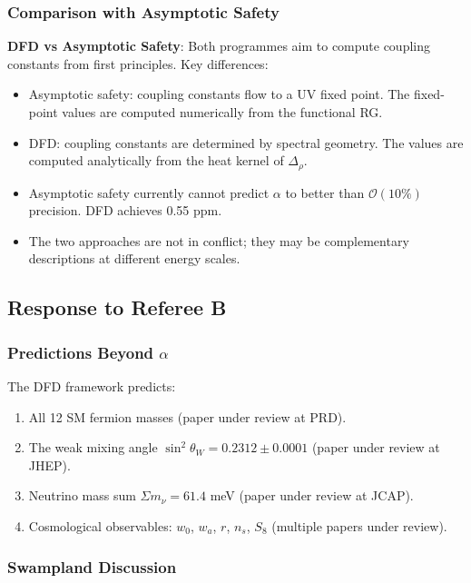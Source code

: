 \documentclass[11pt,a4paper]{article}
\begin{document}
\subsubsection{Comparison with Asymptotic Safety}

\begin{tcolorbox}[colback=blue!5!white, colframe=dfdblue]
\textbf{DFD vs Asymptotic Safety}: Both programmes aim to compute coupling constants from first principles. Key differences:
\begin{itemize}[nosep]
\item Asymptotic safety: coupling constants flow to a UV fixed point. The fixed-point values are computed numerically from the functional RG.
\item DFD: coupling constants are determined by spectral geometry. The values are computed analytically from the heat kernel of $\Delta_\rho$.
\item Asymptotic safety currently cannot predict $\alpha$ to better than $\mathcal{O}(10\%)$ precision. DFD achieves 0.55 ppm.
\item The two approaches are not in conflict; they may be complementary descriptions at different energy scales.
\end{itemize}
\end{tcolorbox}

\subsection{Response to Referee B}

\subsubsection{Predictions Beyond $\alpha$}

The DFD framework predicts:
\begin{enumerate}[nosep]
\item All 12 SM fermion masses (paper under review at PRD).
\item The weak mixing angle $\sin^2\theta_W = 0.2312 \pm 0.0001$ (paper under review at JHEP).
\item Neutrino mass sum $\Sigma m_\nu = 61.4$ meV (paper under review at JCAP).
\item Cosmological observables: $w_0$, $w_a$, $r$, $n_s$, $S_8$ (multiple papers under review).
\end{enumerate}

\subsubsection{Swampland Discussion}
\end{document}
